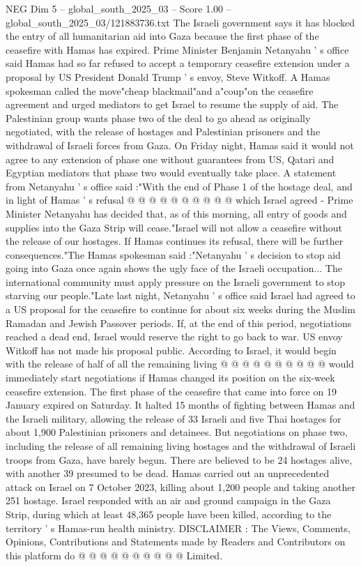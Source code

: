 \begin{textsample}{NEG Dim 5 – global\_south\_2025\_03 – Score 1.00 – global\_south\_2025\_03/121883736.txt}  \label{ex:f5_neg_269}
The Israeli government says it has blocked the entry of all humanitarian aid into Gaza because the first phase of the ceasefire with Hamas has expired.
Prime Minister Benjamin Netanyahu ' s office said Hamas had so far refused to accept a temporary ceasefire extension under a proposal by US President Donald Trump ' s envoy, Steve Witkoff.
A Hamas spokesman called the move"cheap blackmail"and a"coup"on the ceasefire agreement and urged mediators to get Israel to resume the supply of aid.
The Palestinian group wants phase two of the deal to go ahead as originally negotiated, with the release of hostages and Palestinian prisoners and the withdrawal of Israeli forces from Gaza.
On Friday night, Hamas said it would not agree to any extension of phase one without guarantees from US, Qatari and Egyptian mediators that phase two would eventually take place.
A statement from Netanyahu ' s office said :"With the end of Phase 1 of the hostage deal, and in light of Hamas ' s refusal @ @ @ @ @ @ @ @ @ @ which Israel agreed - Prime Minister Netanyahu has decided that, as of this morning, all entry of goods and supplies into the Gaza Strip will cease."Israel will not allow a ceasefire without the release of our hostages.
If Hamas continues its refusal, there will be further consequences."The Hamas spokesman said :"Netanyahu ' s decision to stop aid going into Gaza once again shows the ugly face of the Israeli occupation...
The international community must apply pressure on the Israeli government to stop starving our people."Late last night, Netanyahu ' s office said Israel had agreed to a US proposal for the ceasefire to continue for about six weeks during the Muslim Ramadan and Jewish Passover periods.
If, at the end of this period, negotiations reached a dead end, Israel would reserve the right to go back to war.
US envoy Witkoff has not made his proposal public.
According to Israel, it would begin with the release of half of all the remaining living @ @ @ @ @ @ @ @ @ @ would immediately start negotiations if Hamas changed its position on the six-week ceasefire extension.
The first phase of the ceasefire that came into force on 19 January expired on Saturday.
It halted 15 months of fighting between Hamas and the Israeli military, allowing the release of 33 Israeli and five Thai hostages for about 1,900 Palestinian prisoners and detainees.
But negotiations on phase two, including the release of all remaining living hostages and the withdrawal of Israeli troops from Gaza, have barely begun.
There are believed to be 24 hostages alive, with another 39 presumed to be dead.
Hamas carried out an unprecedented attack on Israel on 7 October 2023, killing about 1,200 people and taking another 251 hostage.
Israel responded with an air and ground campaign in the Gaza Strip, during which at least 48,365 people have been killed, according to the territory ' s Hamas-run health ministry.
DISCLAIMER : The Views, Comments, Opinions, Contributions and Statements made by Readers and Contributors on this platform do @ @ @ @ @ @ @ @ @ @ Limited.

\end{textsample}
